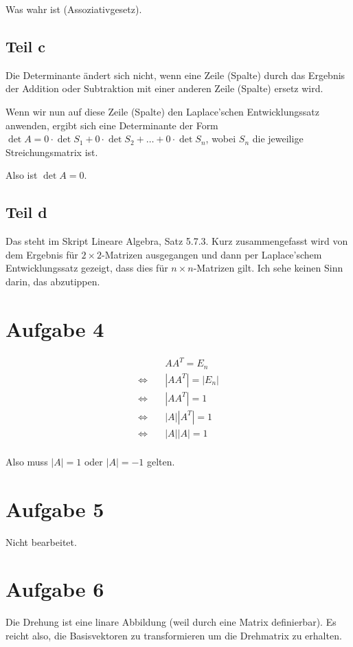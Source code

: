 \documentclass[a4paper,german,12pt,smallheadings]{scrartcl}
\begin{document}
Was wahr ist (Assoziativgesetz).

\subsection*{Teil c}
Die Determinante ändert sich nicht, wenn eine Zeile (Spalte) durch das Ergebnis
der Addition oder Subtraktion mit einer anderen Zeile (Spalte) ersetz wird.

Wenn wir nun auf diese Zeile (Spalte) den Laplace'schen Entwicklungssatz
anwenden, ergibt sich eine Determinante der Form $\det A = 0 \cdot \det S_1 + 0
\cdot \det S_2 + \dots + 0 \cdot \det S_n$, wobei $S_n$ die jeweilige
Streichungsmatrix ist.

Also ist $\det A = 0$.

\subsection*{Teil d}

Das steht im Skript Lineare Algebra, Satz 5.7.3. Kurz zusammengefasst wird von
dem Ergebnis für $2\times2$-Matrizen ausgegangen und dann per Laplace'schem
Entwicklungssatz gezeigt, dass dies für $n\times n$-Matrizen gilt. Ich sehe
keinen Sinn darin, das abzutippen.

\section{Aufgabe 4}
\begin{align*}
  &AA^T = E_n\\
  \Leftrightarrow\quad&|AA^T| = |E_n| \\
  \Leftrightarrow\quad&|AA^T| = 1 \\
  \Leftrightarrow\quad&|A||A^T| = 1 \\
  \Leftrightarrow\quad&|A||A| = 1 \\
\end{align*}

Also muss $|A| = 1$ oder $|A| = -1$ gelten.

\section{Aufgabe 5}
Nicht bearbeitet.

\section{Aufgabe 6}
Die Drehung ist eine linare Abbildung (weil durch eine Matrix definierbar). Es
reicht also, die Basisvektoren zu transformieren um die Drehmatrix zu erhalten.
\end{document}
